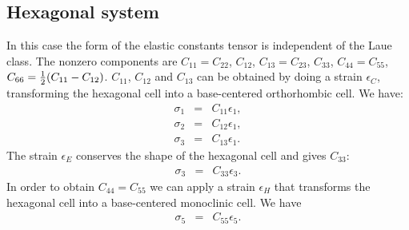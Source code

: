 \documentclass[12pt,a4paper,twoside]{report}
\begin{document}
{\color{web-blue}\subsection{Hexagonal system}}
\color{black}

In this case the form of the elastic constants tensor is independent of
the Laue class. The nonzero components are $C_{11}=C_{22}$, $C_{12}$, 
$C_{13}=C_{23}$, $C_{33}$, $C_{44}=C_{55}$, $C_{66}={1\over 2} 
(C_{11}-C_{12})$. 
$C_{11}$, $C_{12}$ and $C_{13}$ can be obtained by doing a strain $\epsilon_C$,
transforming the hexagonal cell into a base-centered orthorhombic
cell. We have:
\begin{eqnarray}
\sigma_1&=&C_{11} \epsilon_1,  \\
\sigma_2&=&C_{12} \epsilon_1,  \\
\sigma_3&=&C_{13} \epsilon_1.
\end{eqnarray}
The strain $\epsilon_E$ conserves the shape of the hexagonal cell and
gives $C_{33}$:
\begin{eqnarray}
\sigma_3&=&C_{33} \epsilon_3.  
\end{eqnarray}
In order to obtain $C_{44}=C_{55}$ we can apply a strain $\epsilon_H$ 
that transforms the hexagonal cell into a base-centered monoclinic cell.
We have
\begin{eqnarray}
\sigma_5&=&C_{55} \epsilon_5. 
\end{eqnarray}
\end{document}
